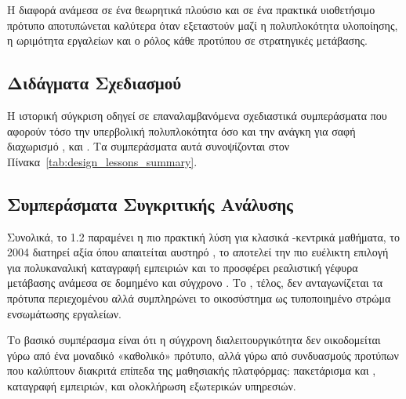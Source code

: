 Η διαφορά ανάμεσα σε ένα θεωρητικά πλούσιο και σε ένα πρακτικά υιοθετήσιμο πρότυπο αποτυπώνεται καλύτερα όταν εξεταστούν μαζί η πολυπλοκότητα υλοποίησης, η ωριμότητα εργαλείων και ο ρόλος κάθε προτύπου σε στρατηγικές μετάβασης.



\subsection{Διδάγματα Σχεδιασμού}
\label{subsec:design_lessons}

Η ιστορική σύγκριση οδηγεί σε επαναλαμβανόμενα σχεδιαστικά συμπεράσματα που αφορούν τόσο την υπερβολική πολυπλοκότητα όσο και την ανάγκη για σαφή διαχωρισμό ,  και . Τα συμπεράσματα αυτά συνοψίζονται στον Πίνακα~\ref{tab:design_lessons_summary}.



\subsection{Συμπεράσματα Συγκριτικής Ανάλυσης}
\label{subsec:comparative_conclusions}

Συνολικά, το  1.2 παραμένει η πιο πρακτική λύση για κλασικά -κεντρικά μαθήματα, το  2004 διατηρεί αξία όπου απαιτείται αυστηρό , το  αποτελεί την πιο ευέλικτη επιλογή για πολυκαναλική καταγραφή εμπειριών και το  προσφέρει ρεαλιστική γέφυρα μετάβασης ανάμεσα σε δομημένο  και σύγχρονο . Το , τέλος, δεν ανταγωνίζεται τα πρότυπα περιεχομένου αλλά συμπληρώνει το οικοσύστημα ως τυποποιημένο στρώμα ενσωμάτωσης εργαλείων.

Το βασικό συμπέρασμα είναι ότι η σύγχρονη διαλειτουργικότητα δεν οικοδομείται γύρω από ένα μοναδικό «καθολικό» πρότυπο, αλλά γύρω από συνδυασμούς προτύπων που καλύπτουν διακριτά επίπεδα της μαθησιακής πλατφόρμας: πακετάρισμα και , καταγραφή εμπειριών, και ολοκλήρωση εξωτερικών υπηρεσιών.
